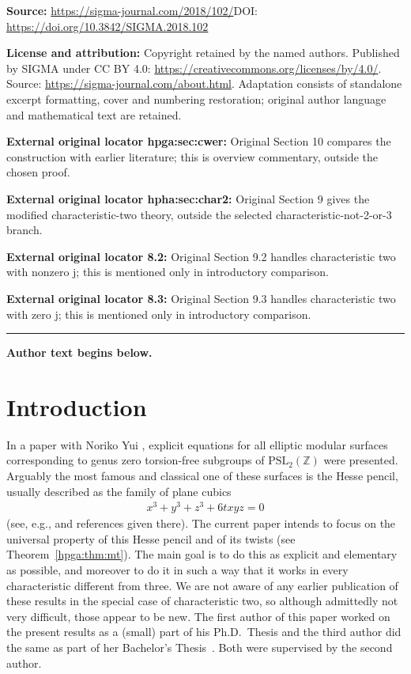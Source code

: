 \documentclass[11pt]{article}
\numberwithin{equation}{section}
\begin{document}
\noindent\textbf{Source:} \url{https://sigma-journal.com/2018/102/}\quad DOI: \url{https://doi.org/10.3842/SIGMA.2018.102}\par
\noindent\textbf{License and attribution:} Copyright retained by the named authors. Published by SIGMA under CC BY 4.0: \url{https://creativecommons.org/licenses/by/4.0/}. Source: \url{https://sigma-journal.com/about.html}. Adaptation consists of standalone excerpt formatting, cover and numbering restoration; original author language and mathematical text are retained.\par
\noindent\textbf{External original locator hpga:sec:cwer:} Original Section 10 compares the construction with earlier literature; this is overview commentary, outside the chosen proof.\par
\noindent\textbf{External original locator hpha:sec:char2:} Original Section 9 gives the modified characteristic-two theory, outside the selected characteristic-not-2-or-3 branch.\par
\noindent\textbf{External original locator 8.2:} Original Section 9.2 handles characteristic two with nonzero j; this is mentioned only in introductory comparison.\par
\noindent\textbf{External original locator 8.3:} Original Section 9.3 handles characteristic two with zero j; this is mentioned only in introductory comparison.\par
\medskip\hrule\medskip\noindent\textbf{Author text begins below.}\par
\setcounter{section}{0}
\setcounter{subsection}{0}
\setcounter{subsubsection}{0}
\setcounter{Theorem}{0}
\setcounter{equation}{0}
\section{Introduction}

In a paper with Noriko Yui \cite{TY2007}, explicit equations for all elliptic modular surfaces corresponding to genus zero torsion-free subgroups of $\mbox{PSL}_2({\mathbb Z})$ were presented. Arguably the most famous and classical one of these surfaces is the Hesse pencil, usually described as the family of plane cubics
\begin{gather*}
x^3+y^3+z^3+6txyz=0
\end{gather*}
(see, e.g., \cite[Table~2]{TY2007} and references given there). The current paper intends to focus on the universal property of this Hesse pencil and of its twists (see Theorem~\ref{hpga:thm:mt}). The main goal is to do this as explicit and elementary as possible, and moreover to do it in such a way that it works in every characteristic different from three. We are not aware of any earlier publication of these results in the special case of characteristic two, so although admittedly not very difficult, those appear to be new. The first author of this paper worked on the present results as a (small) part of his Ph.D.~Thesis \cite{ane} and the third author did the same as part of her Bachelor's Thesis~\cite{tuijp2015}. Both were supervised by the second author.
\end{document}
